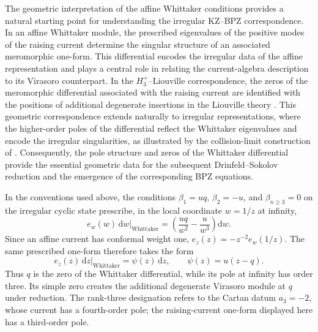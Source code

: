 \documentclass[a4paper,11pt]{article}
\newcommand{\dd}{\mathrm{d}}
\numberwithin{equation}{section}
\begin{document}
The geometric interpretation of the affine Whittaker conditions provides a natural starting point for understanding the irregular KZ–BPZ correspondence. In an affine Whittaker module, the prescribed eigenvalues of the positive modes of the raising current determine the singular structure of an associated meromorphic one-form. This differential encodes the irregular data of the affine representation and plays a central role in relating the current-algebra description to its Virasoro counterpart. In the $H_3^+$–Liouville correspondence, the zeros of the meromorphic differential associated with the raising current are identified with the positions of additional degenerate insertions in the Liouville theory \cite{RibaultTeschner2005}. This geometric correspondence extends naturally to irregular representations, where the higher-order poles of the differential reflect the Whittaker eigenvalues and encode the irregular singularities, as illustrated by the collision-limit construction of \cite{GaiottoLamyPoirier2013}. Consequently, the pole structure and zeros of the Whittaker differential provide the essential geometric data for the subsequent Drinfeld–Sokolov reduction and the emergence of the corresponding BPZ equations.


In the conventions used above, the conditions
$\beta_{1}=u q$, $\beta_{2}=-u$, and $\beta_{n\geq3}=0$ on the irregular
cyclic state prescribe, in the local coordinate $w=1/z$ at infinity,
\begin{equation}
 \left.e_{w}(w)\,\dd w\right|_{\mathrm{Whittaker}}
 =\left(\frac{u q}{w^{2}}-\frac{u}{w^{3}}\right)\dd w.
\end{equation}
Since an affine current has conformal weight one,
$e_{z}(z)=-z^{-2}e_{w}(1/z)$.  The same prescribed one-form therefore takes
the form
\begin{equation}
 \label{equation:Whittaker meromorphic differential}
 \left.e_{z}(z)\,\dd z\right|_{\mathrm{Whittaker}}
 =\psi(z)\,\dd z,
 \qquad \psi(z)=u(z-q).
\end{equation}
Thus $q$ is the zero of the Whittaker differential, while its pole at
infinity has order three.  Its simple zero creates the additional degenerate Virasoro module
at $q$ under reduction.  The rank-three designation refers to the
Cartan datum $a_{3}=-2$, whose current has a fourth-order pole;
the raising-current one-form displayed here has a third-order pole.
\end{document}
